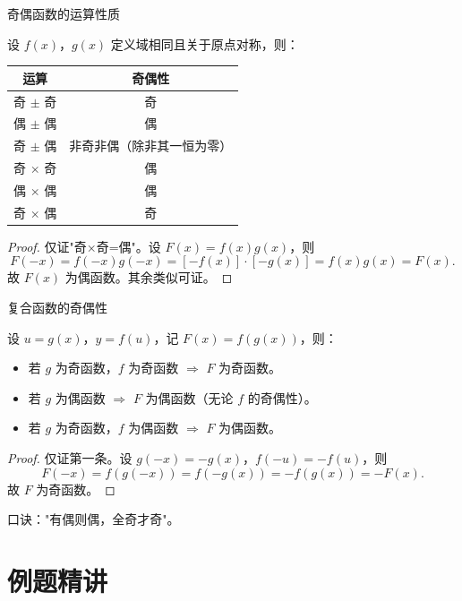 \documentclass[aspectratio=169,11pt]{ctexbeamer}
\newenvironment{theorem}[1][定理]{\begin{theorembox}[#1]}{\end{theorembox}}
\renewenvironment{theorem}[1][定理]{\begin{theorembox}[#1]}{\end{theorembox}}
\newenvironment{remark}[1][注]{\begin{remarkbox}[#1]}{\end{remarkbox}}
\renewenvironment{remark}[1][注]{\begin{remarkbox}[#1]}{\end{remarkbox}}
\begin{document}
	\begin{frame}[allowframebreaks]{奇偶函数的运算性质}
		\begin{theorem}[四则运算的奇偶性]
			设 $f(x)$，$g(x)$ 定义域相同且关于原点对称，则：
			\begin{center}
				\begin{tabular}{c|c}
					\toprule
					运算 & 奇偶性 \\
					\midrule
					奇 $\pm$ 奇 & 奇 \\
					偶 $\pm$ 偶 & 偶 \\
					奇 $\pm$ 偶 & 非奇非偶（除非其一恒为零）\\
					奇 $\times$ 奇 & 偶 \\
					偶 $\times$ 偶 & 偶 \\
					奇 $\times$ 偶 & 奇 \\
					\bottomrule
				\end{tabular}
			\end{center}
		\end{theorem}
		\begin{proof}
			仅证"奇×奇=偶"。设 $F(x)=f(x)g(x)$，则
			\[
			F(-x)=f(-x)g(-x)=[-f(x)]\cdot[-g(x)]=f(x)g(x)=F(x).
			\]
			故 $F(x)$ 为偶函数。其余类似可证。
		\end{proof}
	\end{frame}
	
	\begin{frame}[allowframebreaks]{复合函数的奇偶性}
		\begin{theorem}[复合函数的奇偶性]
			设 $u=g(x)$，$y=f(u)$，记 $F(x)=f(g(x))$，则：
			\begin{itemize}
				\item 若 $g$ 为奇函数，$f$ 为奇函数 $\Rightarrow$ $F$ 为奇函数。
				\item 若 $g$ 为偶函数 $\Rightarrow$ $F$ 为偶函数（无论 $f$ 的奇偶性）。
				\item 若 $g$ 为奇函数，$f$ 为偶函数 $\Rightarrow$ $F$ 为偶函数。
			\end{itemize}
		\end{theorem}
		\begin{proof}
			仅证第一条。设 $g(-x)=-g(x)$，$f(-u)=-f(u)$，则
			\[
			F(-x)=f(g(-x))=f(-g(x))=-f(g(x))=-F(x).
			\]
			故 $F$ 为奇函数。
		\end{proof}
		\begin{remark}
			口诀："有偶则偶，全奇才奇"。
		\end{remark}
	\end{frame}
	
	\section{例题精讲}
	
\end{document}
